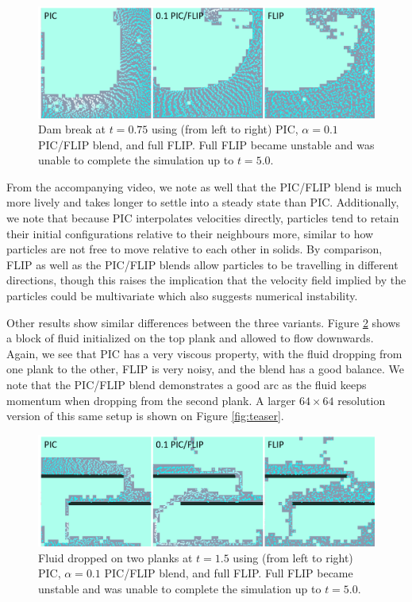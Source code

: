 \documentclass[sigconf]{acmart}
\begin{document}
\begin{figure}[ht]
  \centering
  \includegraphics[width=\linewidth]{img/Dam_Break.png}
  \caption{Dam break at $t=0.75$ using (from left to right) PIC, $\alpha{}=0.1$ PIC/FLIP blend, and full FLIP. Full FLIP became unstable and was unable to complete the simulation up to $t=5.0$.} \label{fig:dambreak}
\end{figure}

From the accompanying video, we note as well that the PIC/FLIP blend is much more lively and takes longer to settle into a steady state than PIC. Additionally, we note that because PIC interpolates velocities directly, particles tend to retain their initial configurations relative to their neighbours more, similar to how particles are not free to move relative to each other in solids. By comparison, FLIP as well as the PIC/FLIP blends allow particles to be travelling in different directions, though this raises the implication that the velocity field implied by the particles could be multivariate which also suggests numerical instability.

Other results show similar differences between the three variants. Figure \ref{fig:planks} shows a block of fluid initialized on the top plank and allowed to flow downwards. Again, we see that PIC has a very viscous property, with the fluid dropping from one plank to the other, FLIP is very noisy, and the blend has a good balance. We note that the PIC/FLIP blend demonstrates a good arc as the fluid keeps momentum when dropping from the second plank. A larger $64\times{}64$ resolution version of this same setup is shown on Figure \ref{fig:teaser}.

\begin{figure}[ht]
  \centering
  \includegraphics[width=\linewidth]{img/Maze.png}
  \caption{Fluid dropped on two planks at $t=1.5$ using (from left to right) PIC, $\alpha{}=0.1$ PIC/FLIP blend, and full FLIP. Full FLIP became unstable and was unable to complete the simulation up to $t=5.0$.} \label{fig:planks}
\end{figure}
\end{document}
